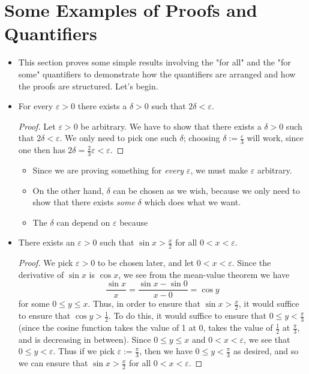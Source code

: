 \documentclass[../main.tex]{subfiles}
\begin{document}
\section{Some Examples of Proofs and Quantifiers}
\begin{itemize}
    \item This section proves some simple results involving the "for all" and the "for some" quantifiers to demonstrate how the quantifiers are arranged and how the proofs are structured. Let's begin.
    \item \leavevmode\vspace{-\dimexpr\baselineskip+\topsep}
    \begin{prop}
        For every $\varepsilon>0$ there exists a $\delta>0$ such that $2\delta<\varepsilon$.
        \begin{proof}
            Let $\varepsilon>0$ be arbitrary. We have to show that there exists a $\delta>0$ such that $2\delta<\varepsilon$. We only need to pick one such $\delta$; choosing $\delta:=\frac{\varepsilon}{3}$ will work, since one then has $2\delta=\frac{2}{3}\varepsilon<\varepsilon$.
        \end{proof}
    \end{prop}
    \begin{itemize}
        \item Since we are proving something for \emph{every} $\varepsilon$, we must make $\varepsilon$ arbitrary.
        \item On the other hand, $\delta$ can be chosen as we wish, because we only need to show that there exists \emph{some} $\delta$ which does what we want.
        \item The $\delta$ can depend on $\varepsilon$ because 
    \end{itemize}
    \item \leavevmode\vspace{-\dimexpr\baselineskip+\topsep}
    \begin{prop}
        There exists an $\varepsilon>0$ such that $\sin x>\frac{x}{2}$ for all $0<x<\varepsilon$.
        \begin{proof}
            We pick $\varepsilon>0$ to be chosen later, and let $0<x<\varepsilon$. Since the derivative of $\sin x$ is $\cos x$, we see from the mean-value theorem we have $$\frac{\sin x}{x}=\frac{\sin x-\sin 0}{x-0}=\cos y$$ for some $0\leq y\leq x$. Thus, in order to ensure that $\sin x>\frac{x}{2}$, it would suffice to ensure that $\cos y>\frac{1}{2}$. To do this, it would suffice to ensure that $0\leq y<\frac{\pi}{3}$ (since the cosine function takes the value of 1 at 0, takes the value of $\frac{1}{2}$ at $\frac{\pi}{3}$, and is decreasing in between). Since $0\leq y\leq x$ and $0<x<\varepsilon$, we see that $0\leq y<\varepsilon$. Thus if we pick $\varepsilon:=\frac{\pi}{3}$, then we have $0\leq y<\frac{\pi}{3}$ as desired, and so we can ensure that $\sin x>\frac{x}{2}$ for all $0<x<\varepsilon$.

\end{proof}
\end{prop}
\end{itemize}
\end{document}
